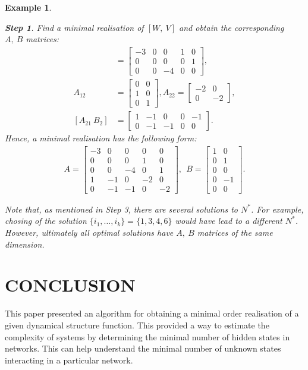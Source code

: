 \documentclass[twocolumn,12pt]{autart}
\theoremstyle{plain}
\newtheorem{example}{Example}
\newtheorem{Steps}{Step}
\begin{document}
\begin{example}
\begin{Steps}
Find a minimal realisation of $[W,~V]$ and obtain the corresponding $A,~B$ matrices:
\begin{align*}
[{A}_{11}~{B}_1]&= \begin{bmatrix}
-3 & 0 & 0 & 1 & 0 \\
0 & 0 & 0 & 0 & 1\\
0 & 0 & -4 & 0 & 0 
\end{bmatrix},\\
{A}_{12}&= \begin{bmatrix}
0 & 0\\ 1& 0\\ 0 &1
\end{bmatrix}, A_{22}=\begin{bmatrix}
-2 & 0\\ 0& -2
\end{bmatrix},\\
[{A}_{21}~{B}_2]&=\begin{bmatrix}
1 & -1 & 0 & 0 & -1\\
0 & -1 & -1 & 0 & 0 
\end{bmatrix}.
\end{align*}
Hence, a minimal realisation has the following form:
\begin{align*}
A=\begin{bmatrix}
-3 & 0 & 0 & 0 & 0 \\
0 & 0 & 0 & 1 & 0\\
0 & 0 & -4 & 0 & 1\\
 1 & -1 & 0 & -2 & 0\\
0 & -1 & -1 & 0 & -2
\end{bmatrix},~~
B= \begin{bmatrix}
 1 & 0 \\
 0 & 1\\
 0 & 0 \\
 0 & -1\\
 0 & 0 
\end{bmatrix}.
\end{align*}
\end{Steps}


Note that, as mentioned in Step 3, there are several solutions to $N^*$. For example, chosing of the solution $\{i_1,\ldots,i_k\}=\{1,3,4,6\}$ would have lead to a different $N^*$.
However, ultimately all optimal solutions have $A,~B$ matrices of the same dimension.

\end{example}
\section{CONCLUSION}
This paper presented an algorithm for obtaining a minimal order realisation of a given dynamical structure function. This provided a way to estimate the complexity of systems by determining the minimal number of hidden states in networks. This can help understand the minimal number of unknown states interacting in a particular network.
 
\end{document}

